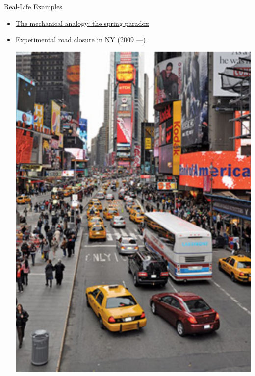 \documentclass[10pt]{beamer}
\begin{document}
\begin{frame}{Real-Life Examples}
  \begin{itemize}[<+->]
    \item \href{https://www.youtube.com/watch?v=Cg73j3QYRJc}{The mechanical analogy: the spring paradox}
    \item \href{https://engines.egr.uh.edu/episode/2814}{Experimental road closure in NY (2009 ---)}
      \begin{center}
        \includegraphics[scale=.3]{fig/note02/nybefore.png}\hspace{3mm}

\end{center}
\end{itemize}
\end{frame}
\end{document}
